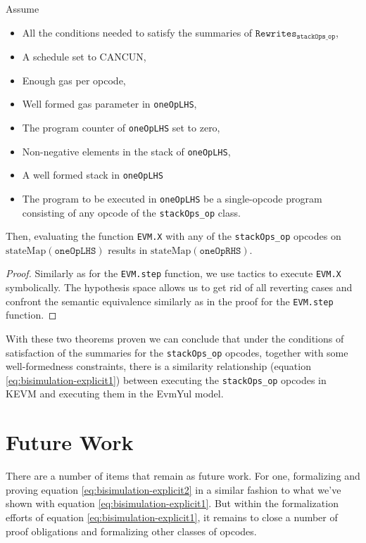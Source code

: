 \begin{theorem}[X_oneOp]\label{thm:X_oneOp}
\leanok
{}

Assume

\begin{itemize}
\item All the conditions needed to satisfy the summaries of
  $\texttt{Rewrites}_{\texttt{stackOps_op}}$,
\item A schedule set to CANCUN,
\item Enough gas per opcode,
\item Well formed gas parameter in \texttt{oneOpLHS},
\item The program counter of \texttt{oneOpLHS} set to zero,
\item Non-negative elements in the stack of \texttt{oneOpLHS},
\item A well formed stack in \texttt{oneOpLHS}
\item The program to be executed in \texttt{oneOpLHS} be a single-opcode program
  consisting of any opcode of the \texttt{stackOps_op} class.
\end{itemize}

Then, evaluating the function \texttt{EVM.X} with any of the
\texttt{stackOps_op} opcodes on $\text{stateMap}(\texttt{oneOpLHS})$ results in
$\text{stateMap}(\texttt{oneOpRHS})$.

\end{theorem}

\begin{proof}

Similarly as for the \texttt{EVM.step} function, we use tactics to execute
\texttt{EVM.X} symbolically. The hypothesis space allows us to get rid of all
reverting cases and confront the semantic equivalence similarly as in the proof
for the \texttt{EVM.step} function.

\end{proof}

With these two theorems proven we can conclude that under the conditions of
satisfaction of the summaries for the \texttt{stackOps_op} opcodes, together
with some well-formedness constraints, there is a similarity relationship
(equation \ref{eq:bisimulation-explicit1}) between executing the
\texttt{stackOps_op} opcodes in KEVM and executing them in the EvmYul model.

\section{Future Work}

There are a number of items that remain as future work. For one, formalizing and
proving equation \ref{eq:bisimulation-explicit2} in a similar fashion to what
we've shown with equation \ref{eq:bisimulation-explicit1}.
But within the formalization efforts of equation
\ref{eq:bisimulation-explicit1}, it remains to close a number of proof
obligations and formalizing other classes of opcodes.
